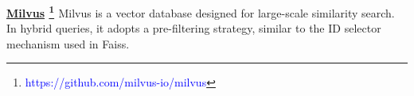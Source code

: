 \documentclass[sigconf, nonacm]{acmart}
\begin{document}
{\noindent\textbf{\underline{Milvus} \footnote{\textcolor{blue}{https://github.com/milvus-io/milvus}} \cite{milvus}} Milvus is a vector database designed for large-scale similarity search. In hybrid queries, it adopts a pre-filtering strategy, similar to the ID selector mechanism used in Faiss.

	
%	
%	
%	
%	
%	
}
\end{document}
